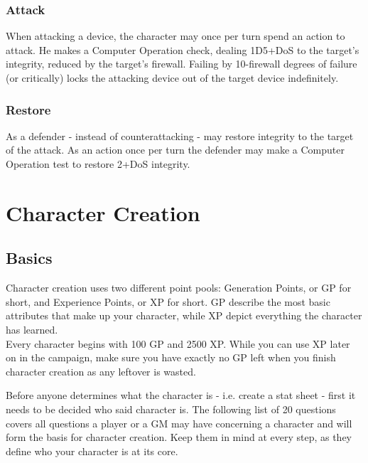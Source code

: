 \documentclass[12pt,a4paper,openany]{book}
\begin{document}
	\subsection*{Attack}
	When attacking a device, the character may once per turn spend an action to attack. He makes a Computer Operation check, dealing 1D5+DoS to the target’s integrity, reduced by the target’s firewall. Failing by 10-firewall degrees of failure (or critically) locks the attacking device out of the target device indefinitely.
	\subsection*{Restore}
	As a defender - instead of counterattacking - may restore integrity to the target of the attack. As an action once per turn the defender may make a Computer Operation test to restore 2+DoS integrity.
	
	\chapter{Character Creation}
	\section{Basics}
	Character creation uses two different point pools: Generation Points, or GP for short, and Experience Points, or XP for short. GP describe the most basic attributes that make up your character, while XP depict everything the character has learned.\\
	Every character begins with 100 GP and 2500 XP. While you can use XP later on in the campaign, make sure you have exactly no GP left when you finish character creation as any leftover is wasted.
	
	Before anyone determines what the character is - i.e. create a stat sheet - first it needs to be decided who said character is. The following list of 20 questions covers all questions a player or a GM may have concerning a character and will form the basis for character creation. Keep them in mind at every step, as they define who your character is at its core.
	
\end{document}
